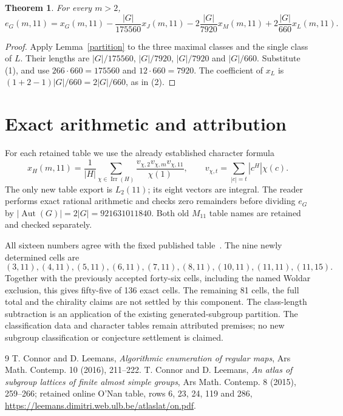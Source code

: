\documentclass[11pt,a4paper]{article}
\newtheorem{theorem}{Theorem}\newtheorem{lemma}[theorem]{Lemma}
\newcommand{\Aut}{\operatorname{Aut}}
\begin{document}
\begin{theorem}\label{formula}
For every $m>2$,
\[
 e_G(m,11)=x_G(m,11)-\frac{|G|}{175560}x_J(m,11)
 -2\frac{|G|}{7920}x_M(m,11)
 +2\frac{|G|}{660}x_L(m,11). \tag{2}
\]
\end{theorem}
\begin{proof}
Apply Lemma~\ref{partition} to the three maximal classes and the
single class of $L$. Their lengths are $|G|/175560$,
$|G|/7920$, $|G|/7920$ and $|G|/660$.
Substitute (1), and use $266\cdot660=175560$ and
$12\cdot660=7920$. The coefficient of $x_L$ is
$(1+2-1)|G|/660=2|G|/660$, as in (2).
\end{proof}

\section{Exact arithmetic and attribution}
For each retained table we use the already established character formula
\[
 x_H(m,11)=\frac1{|H|}\sum_{\chi\in\operatorname{Irr}(H)}
 \frac{v_{\chi,2}v_{\chi,m}v_{\chi,11}}{\chi(1)},
 \qquad v_{\chi,t}=\sum_{|c|=t}|c^H|\chi(c).
\]
The only new table export is $L_2(11)$; its eight vectors are integral.
The reader performs exact rational arithmetic and checks zero remainders
before dividing $e_G$ by $|\Aut(G)|=2|G|=921631011840$.
Both old $M_{11}$ table names are retained and checked separately.

All sixteen numbers agree with the fixed published table~\cite{CL}.
The nine newly determined cells are
\[
 (3,11),(4,11),(5,11),(6,11),(7,11),(8,11),(10,11),(11,11),(11,15).
\]
Together with the previously accepted forty-six cells, including the
named Woldar exclusion, this gives fifty-five of 136 exact cells.
The remaining 81 cells, the full total and the chirality claims are
not settled by this component. The class-length subtraction is an
application of the existing generated-subgroup partition. The
classification data and character tables remain attributed premises;
no new subgroup classification or conjecture settlement is claimed.
\begin{thebibliography}{9}
 T. Connor and D. Leemans, \emph{Algorithmic enumeration of
regular maps}, Ars Math. Contemp. 10 (2016), 211--222.
 T. Connor and D. Leemans, \emph{An atlas of subgroup
lattices of finite almost simple groups}, Ars Math. Contemp. 8 (2015),
259--266; retained online O'Nan table, rows 6, 23, 24, 119 and 286,
\url{https://leemans.dimitri.web.ulb.be/atlaslat/on.pdf}.
\end{thebibliography}
\end{document}
